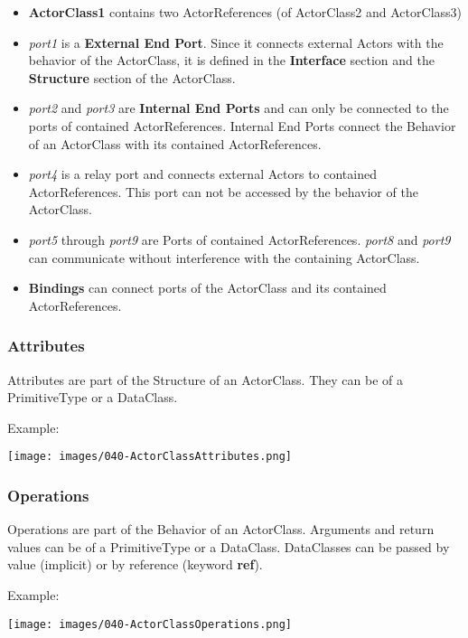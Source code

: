 \begin{itemize}
\item \textbf{ActorClass1} contains two ActorReferences (of ActorClass2 and ActorClass3)
\item \textit{port1} is a \textbf{External End Port}. Since it connects external Actors with the behavior of the ActorClass, it is defined in the \textbf{Interface} section and the \textbf{Structure} section of the ActorClass.
\item \textit{port2} and \textit{port3} are \textbf{Internal End Ports} and can only be connected to the ports of contained ActorReferences. Internal End Ports connect the Behavior of an ActorClass with its contained ActorReferences.
\item \textit{port4} is a relay port and connects external Actors to contained ActorReferences. This port can not be accessed by the behavior of the ActorClass.
\item \textit{port5} through \textit{port9} are Ports of contained ActorReferences. \textit{port8} and \textit{port9} can communicate without interference with the containing ActorClass.
\item \textbf{Bindings} can connect ports of the ActorClass and its contained ActorReferences. 
\end{itemize}

\subsubsection{Attributes}

Attributes are part of the Structure of an ActorClass. They can be of a PrimitiveType or a DataClass.

Example:

\texttt{[image: images/040-ActorClassAttributes.png]}

\subsubsection{Operations}

Operations are part of the Behavior of an ActorClass.  Arguments and return values can be of a PrimitiveType or a DataClass. DataClasses can be passed by value (implicit) or by reference (keyword \textbf{ref}).

Example:

\texttt{[image: images/040-ActorClassOperations.png]}

